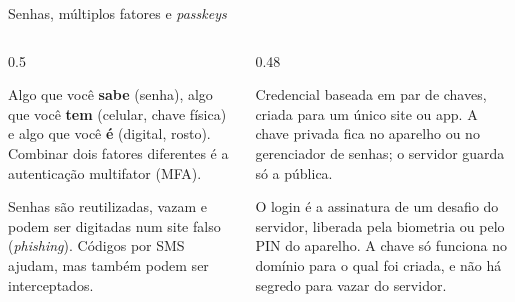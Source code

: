 \begin{frame}{Senhas, múltiplos fatores e \emph{passkeys}}
  \begin{columns}[T]
    \begin{column}{0.5\textwidth}
      \begin{definicao}
        Algo que você \textbf{sabe} (senha), algo que você \textbf{tem} (celular, chave física) e algo que você \textbf{é} (digital, rosto). Combinar dois fatores diferentes é a autenticação multifator (MFA).
      \end{definicao}
      \begin{atencao}
        Senhas são reutilizadas, vazam e podem ser digitadas num site falso (\emph{phishing}). Códigos por SMS ajudam, mas também podem ser interceptados.
      \end{atencao}
    \end{column}
    \begin{column}{0.48\textwidth}
      \begin{definicao}
        Credencial baseada em par de chaves, criada para um único site ou app. A chave privada fica no aparelho ou no gerenciador de senhas; o servidor guarda só a pública.
      \end{definicao}
      \begin{pordentro}
        O login é a assinatura de um desafio do servidor, liberada pela biometria ou pelo PIN do aparelho. A chave só funciona no domínio para o qual foi criada, e não há segredo para vazar do servidor.
      \end{pordentro}
    \end{column}
  \end{columns}
\end{frame}

